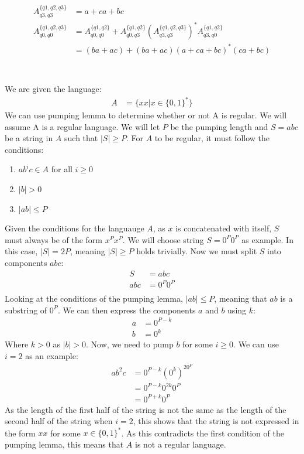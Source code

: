 \documentclass[letterpaper]{article}
\theoremstyle{plain}
\theoremstyle{definition}
\theoremstyle{remark}
\newcommand{\abs}[1]{\lvert #1 \rvert}
\begin{document}
\subsection{}
\begin{align*}
    A_{q3,q3}^{\{q1,q2,q3\}} &= a + ca + bc\\
    A_{q0,q0}^{\{q1,q2,q3\}} &= A_{q0,q0}^{\{q1,q2\}} + A_{q0,q3}^{\{q1,q2\}}(A_{q3,q3}^{\{q1,q2,q3\}})^*A_{q3,q0}^{\{q1,q2\}}\\
    &= (ba + ac) + (ba + ac)(a + ca + bc)^*(ca + bc)\\
\end{align*}

\section{}

We are given the language:
\begin{align*}
    A &= \{xx|x\in\{0,1\}^*\}
\end{align*}
We can use pumping lemma to determine whether or not A is regular. We will assume A is a regular language. We will let $P$ be the pumping length and $S=abc$ be a string in $A$ such that $\abs{S}\geq{P}$. For $A$ to be regular, it must follow the conditions:
\begin{enumerate}
    \item $ab^ic\in{A}$ for all $i\geq{0}$
    \item $\abs{b}>0$
    \item $\abs{ab}\leq{P}$
\end{enumerate}
Given the conditions for the languauge $A$, as $x$ is concatenated with itself, $S$ must always be of the form $x^Px^P$. We will choose string $S=0^P0^P$ as example. In this case, $\abs{S}=2P$, meaning $|S|\geq{P }$ holds trivially. Now we must split $S$ into components $abc$:
\begin{align*}
    S&=abc\\
    abc&=0^P0^P\\
\end{align*}
Looking at the conditions of the pumping lemma, $\abs{ab}\leq{P}$, meaning that $ab$ is a substring of $0^P$. We can then express the components $a$ and $b$ using $k$:
\begin{align*}
    a&=0^{P-k}\\
    b&=0^k
\end{align*}
Where $k>0$ as $\abs{b}>0$. Now, we need to pump $b$ for some $i\geq{0}$. We can use $i=2$ as an example:
\begin{align*}
    ab^2c&=0^{P-k}(0^k)^20^P\\
    &=0^{P-k}0^{2k}0^P\\
    &=0^{P+k}0^P
\end{align*}
As the length of the first half of the string is not the same as the length of the second half of the string when $i=2$, this shows that the string is not expressed in the form $xx$ for some $x\in\{0,1\}^*$. As this contradicts the first condition of the pumping lemma, this means that $A$ is not a regular language.
\end{document}
